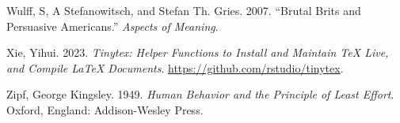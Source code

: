\documentclass[
  letterpaper,
]{latex/krantz}
\newlength{\cslhangindent}
\newenvironment{CSLReferences}[2] %
 {\begin{list}{}{%
  \setlength{\itemindent}{0pt}
  \setlength{\leftmargin}{0pt}
  \setlength{\parsep}{0pt}
  \ifodd #1
   \setlength{\leftmargin}{\cslhangindent}
   \setlength{\itemindent}{-1\cslhangindent}
  \fi
  \setlength{\itemsep}{#2\baselineskip}}}
 {\end{list}}
\theoremstyle{definition}
\theoremstyle{remark}
\begin{document}
\begin{CSLReferences}{1}{0}
Wulff, S, A Stefanowitsch, and Stefan Th. Gries. 2007. {``Brutal Brits
and Persuasive Americans.''} \emph{Aspects of Meaning}.

Xie, Yihui. 2023. \emph{Tinytex: Helper Functions to Install and
Maintain TeX Live, and Compile LaTeX Documents}.
\url{https://github.com/rstudio/tinytex}.

Zipf, George Kingsley. 1949. \emph{Human Behavior and the Principle of
Least Effort}. Oxford, England: Addison-Wesley Press.

\end{CSLReferences}



\printindex
\end{document}
